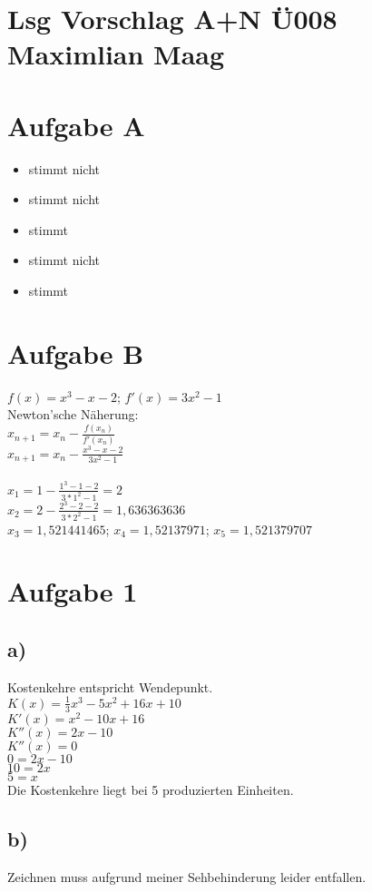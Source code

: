 \documentclass{article}
\begin{document}
	\section*{Lsg Vorschlag A+N Ü008 Maximlian Maag}
	\section*{Aufgabe A}
	\begin{itemize}
		\item stimmt nicht
		\item stimmt nicht
		\item stimmt
		\item stimmt nicht
		\item stimmt
	\end{itemize}
	\section*{Aufgabe B}
	$f(x) = x^3 - x -2$; $f'(x) = 3x^2 -1$ \\
	Newton'sche Näherung: \\
	$x_{n+1} = x_n - \frac{f(x_n)}{f'(x_n)}$ \\
	$x_{n+1} = x_n - \frac{x^3 - x - 2}{3x^2 - 1}$ \\ \\
	$x_1 = 1 - \frac{1^3 - 1 - 2}{3*1^2 - 1} = 2$ \\
	$x_2 = 2 - \frac{2^3 - 2 - 2}{3*2^2 - 1} = 1,636363636$ \\
	$x_3 = 1,521441465$; $x_4 = 1,52137971$; $x_5 = 1,521379707$
	\section*{Aufgabe 1}
	\subsection*{a)}
	Kostenkehre entspricht Wendepunkt. \\
	$K(x) = \frac{1}{3}x^3 - 5x^2 + 16x + 10$ \\
	$K'(x) =  x^2 - 10x + 16$ \\
	$K''(x) =  2x - 10$ \\
	$K''(x) = 0$ \\
	$0 =  2x - 10$ \\
	$10 =  2x$ \\
	$5 =  x$ \\
	Die Kostenkehre liegt bei 5 produzierten Einheiten.
	\subsection*{b)}
	Zeichnen muss aufgrund meiner Sehbehinderung leider entfallen. 
\end{document}
